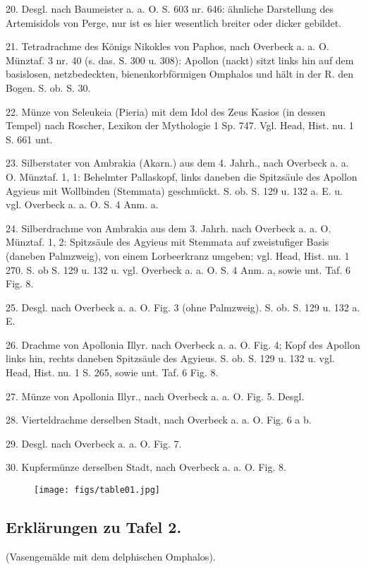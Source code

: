 \documentclass[a4paper, 11pt, oneside]{article}
\begin{document}
20. Desgl. nach Baumeister a. a. O. S. 603 nr. 646: ähnliche Darstellung des Artemisidols von Perge, nur ist es hier wesentlich breiter oder dicker gebildet.

21. Tetradrachme des Königs Nikokles von Paphos, nach Overbeck a. a. O. Münztaf. 3 nr. 40 (s. das. S. 300 u. 308): Apollon (nackt) sitzt links hin auf dem basislosen, netzbedeckten, bienenkorbförmigen Omphalos und hält in der R. den Bogen. S. ob. S. 30.

22. Münze von Seleukeia (Pieria) mit dem Idol des Zeus Kasios (in dessen Tempel) nach Roscher, Lexikon der Mythologie 1 Sp. 747. Vgl. Head, Hist. nu. 1 S. 661 unt.

23. Silberstater von Ambrakia (Akarn.) aus dem 4. Jahrh., nach Overbeck a. a. O. Münztaf. 1, 1: Behelmter Pallaskopf, links daneben die Spitzsäule des Apollon Agyieus mit Wollbinden (Stemmata) geschmückt. S. ob. S. 129 u. 132 a. E. u. vgl. Overbeck a. a. O. S. 4 Anm. a.

24. Silberdrachme von Ambrakia aus dem 3. Jahrh. nach Overbeck a. a. O. Münztaf. 1, 2: Spitzsäule des Agyieus mit Stemmata auf zweistufiger Basis (daneben Palmzweig), von einem Lorbeerkranz umgeben; vgl. Head, Hist. nu. 1 270. S. ob S. 129 u. 132 u. vgl. Overbeck a. a. O. S. 4 Anm. a, sowie unt. Taf. 6 Fig. 8.

25. Desgl. nach Overbeck a. a. O. Fig. 3 (ohne Palmzweig). S. ob. S. 129 u. 132 a. E.

26. Drachme von Apollonia Illyr. nach Overbeck a. a. O. Fig. 4; Kopf des Apollon links hin, rechts daneben Spitzsäule des Agyieus. S. ob. S. 129 u. 132 u. vgl. Head, Hist. nu. 1 S. 265, sowie unt. Taf. 6 Fig. 8.

27. Münze von Apollonia Illyr., nach Overbeck a. a. O. Fig. 5. Desgl.

28. Vierteldrachme derselben Stadt, nach Overbeck a. a. O. Fig. 6 a b.

29. Desgl. nach Overbeck a. a. O. Fig. 7.

30. Kupfermünze derselben Stadt, nach Overbeck a. a. O. Fig. 8.
\clearpage
\vspace*{\fill}
\begin{figure}[H]
\centering
\texttt{[image: figs/table01.jpg]}
\end{figure}
\vspace*{\fill}
\clearpage
\subsection{Erklärungen zu Tafel 2.}
\begin{center}
(Vasengemälde mit dem delphischen Omphalos).
\end{center}
\end{document}
